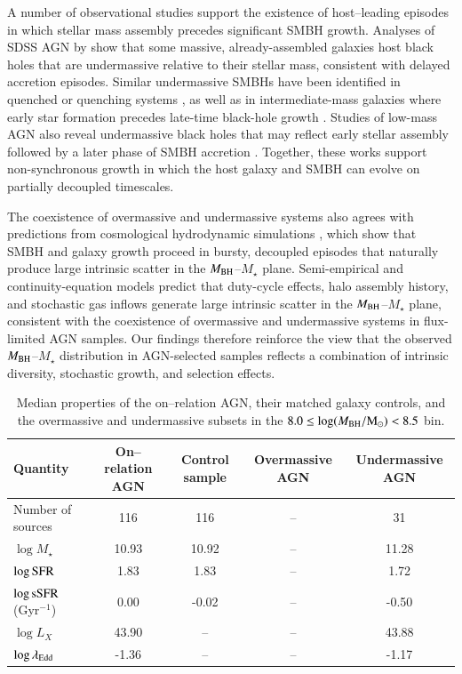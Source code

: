 \documentclass{aa}
\begin{document}
A number of observational studies support the existence of host--leading episodes in which stellar mass assembly precedes significant SMBH growth. Analyses of SDSS AGN by \citet{Kauffmann2009} show that some massive, already-assembled galaxies host black holes that are undermassive relative to their stellar mass, consistent with delayed accretion episodes. Similar undermassive SMBHs have been identified in quenched or quenching systems \citep{Greene2020, Suh2020}, as well as in intermediate-mass galaxies where early star formation precedes late-time black-hole growth \citep{Li2021}. Studies of low-mass AGN also reveal undermassive black holes that may reflect early stellar assembly followed by a later phase of SMBH accretion \citep{Reines2015}. Together, these works support non-synchronous growth in which the host galaxy and SMBH can evolve on partially decoupled timescales.

The coexistence of overmassive and undermassive systems also agrees with predictions from cosmological hydrodynamic simulations \citep[e.g.][]{Habouzit2017, AnglesAlcazar2017, Dubois2021}, which show that SMBH and galaxy growth proceed in bursty, decoupled episodes that naturally produce large intrinsic scatter in the $M_{\rm BH}$--$M_\star$ plane. Semi-empirical and continuity-equation models \citep[e.g.][]{Shankar2013, Shankar2016, Shankar2020, Shankar2025, Aversa2016, Roberts2026} predict that duty-cycle effects, halo assembly history, and stochastic gas inflows generate large intrinsic scatter in the $M_{\rm BH}$--$M_\star$ plane, consistent with the coexistence of overmassive and undermassive systems in flux-limited AGN samples. Our findings therefore reinforce the view that the observed $M_{\rm BH}$--$M_\star$ distribution in AGN-selected samples reflects a combination of intrinsic diversity, stochastic growth, and selection effects.

\begin{table}
\centering
\caption{Median properties of the on–relation AGN, their matched galaxy controls, and the overmassive and undermassive subsets in the
$8.0 \le \log(M_{\rm BH}/{\rm M_\odot}) < 8.5$ bin.}
\label{tab:mbh_bin85_on_relation}
\begin{tabular}{lcccc}
\hline\hline
Quantity & On–relation AGN & Control sample & Overmassive AGN & Undermassive AGN \\
\hline
Number of sources & 116 & 116  & --  &  31\\
$\log M_{\star}$ & 10.93 & 10.92 & -- & 11.28 \\
$\log{\rm SFR}$ & 1.83 & 1.83  & -- & 1.72\\
$\log{\rm sSFR}$ (Gyr$^{-1}$) & 0.00 & -0.02 & -- & -0.50 \\
$\log L_X$ & 43.90 & -- & -- & 43.88\\
$\log \lambda_{\rm Edd}$ & -1.36  & -- & -- & -1.17 \\
\hline
\end{tabular}
\end{table}
\end{document}

